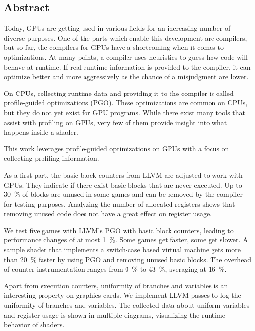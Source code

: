 \newpage
\vspace*{3.5cm}
\begin{center}
\begin{minipage}{12.5cm}
\section*{Abstract}
Today, GPUs are getting used in various fields for an increasing number of diverse purposes.
One of the parts which enable this development are compilers, but so far, the compilers for GPUs have a shortcoming when it comes to optimizations.
At many points, a compiler uses heuristics to guess how code will behave at runtime.
If real runtime information is provided to the compiler, it can optimize better and more aggressively as the chance of a misjudgment are lower.

On CPUs, collecting runtime data and providing it to the compiler is called profile-guided optimizations (PGO).
These optimizations are common on CPUs, but they do not yet exist for GPU programs.
While there exist many tools that assist with profiling on GPUs, very few of them provide insight into what happens inside a shader.

This work leverages profile-guided optimizations on GPUs with a focus on collecting profiling information.

As a first part, the basic block counters from LLVM are adjusted to work with GPUs.
They indicate if there exist basic blocks that are never executed.
Up to \SI{30}{\percent} of blocks are unused in some games and can be removed by the compiler for testing purposes.
Analyzing the number of allocated registers shows that removing unused code does not have a great effect on register usage.

We test five games with LLVM's PGO with basic block counters, leading to performance changes of at most \SI{1}{\percent}.
Some games get faster, some get slower.
A sample shader that implements a switch-case based virtual machine gets more than \SI{20}{\percent} faster by using PGO and removing unused basic blocks.
The overhead of counter instrumentation ranges from \SI{0}{\percent} to \SI{43}{\percent}, averaging at \SI{16}{\percent}.

Apart from execution counters, uniformity of branches and variables is an interesting property on graphics cards.
We implement LLVM passes to log the uniformity of branches and variables.
The collected data about uniform variables and register usage is shown in multiple diagrams, visualizing the runtime behavior of shaders.

\end{minipage}
\end{center}



